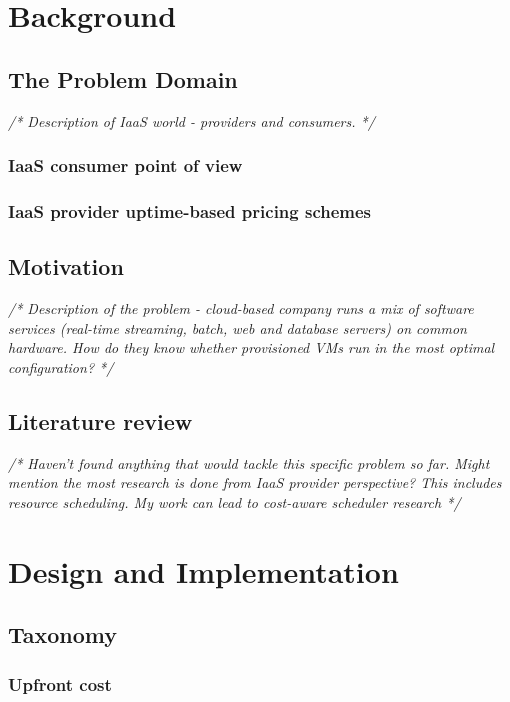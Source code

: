 \documentclass[]{final_report}
\begin{document}
\chapter{Background}

\section{The Problem Domain}
\emph{/* Description of IaaS world - providers and consumers. */}
\subsection{IaaS consumer point of view}
\subsection{IaaS provider uptime-based pricing schemes}

\section{Motivation}
\emph{ /* Description of the problem - cloud-based company runs a mix of software services (real-time streaming, batch, web and database servers) on common hardware. How do they know whether provisioned VMs run in the most optimal configuration? */ }

\section{Literature review}
\emph{/* Haven't found anything that would tackle this specific problem so far. Might mention the most research is done from IaaS provider perspective? This includes resource scheduling. My work can lead to cost-aware scheduler research */}




\chapter{Design and Implementation}

\section{Taxonomy}

\subsection{Upfront cost}
\end{document}
